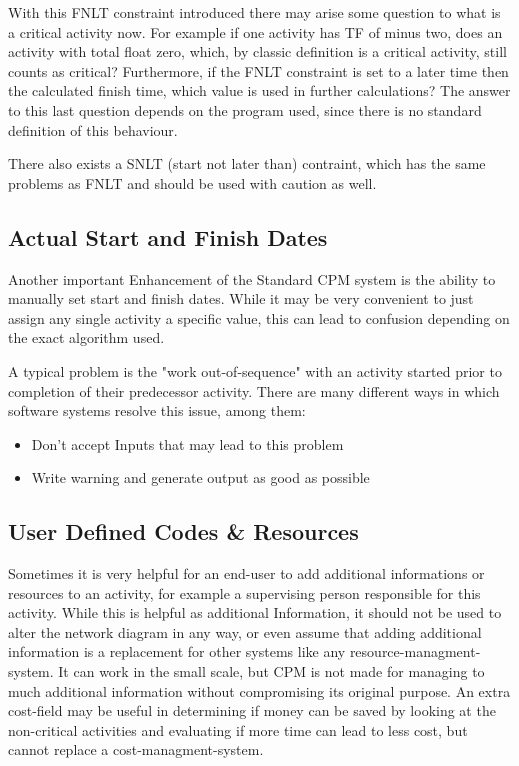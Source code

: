 With this FNLT constraint introduced there may arise some question to what is a critical activity now. For example if one activity has TF of minus two, does an activity with total float zero, which, by classic definition is a critical activity, still counts as critical? Furthermore, if the FNLT constraint is set to a later time then the calculated finish time, which value is used in further calculations? The answer to this last question depends on the program used, since there is no standard definition of this behaviour.

There also exists a SNLT (start not later than) contraint, which has the same problems as FNLT and should be used with caution as well.

\subsection{Actual Start and Finish Dates}

Another important Enhancement of the Standard CPM system is the ability to manually set start and finish dates. While it may be very convenient to just assign any single activity a specific value, this can lead to confusion depending on the exact algorithm used.

A typical problem is the "work out-of-sequence" with an activity started prior to completion of their predecessor activity.
There are many different ways in which software systems resolve this issue, among them:
\begin{itemize}
	\item Don't accept Inputs that may lead to this problem
	\item Write warning and generate output as good as possible
\end{itemize}

\subsection{User Defined Codes \& Resources}

Sometimes it is very helpful for an end-user to add additional informations or resources to an activity, for example a supervising person responsible for this activity. While this is helpful as additional Information, it should not be used to alter the network diagram in any way, or even assume that adding additional information is a replacement for other systems like any resource-managment-system. It can work in the small scale, but CPM is not made for managing to much additional information without compromising its original purpose.
An extra cost-field may be useful in determining if money can be saved by looking at the non-critical activities and evaluating if more time can lead to less cost, but cannot replace a cost-managment-system. 
